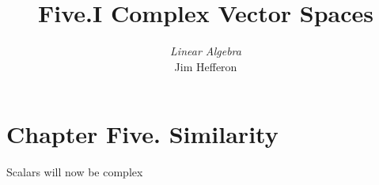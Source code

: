 \usepackage{linalgjh}
\usepackage{present}
\usepackage{directories}  %
\usepackage{xr} %
\usepackage{catchfilebetweentags}
\usepackage{etoolbox} %
\makeatletter
\patchcmd{\CatchFBT@Fin@l}{\endlinechar\m@ne}{}
  {}{}
\makeatother

\usepackage{polynom}  %

{
}
\hypersetup{colorlinks=true,linkcolor=blue} 

\title[Complex Vector Spaces] %
{Five.I Complex Vector Spaces}

\author{\textit{Linear Algebra} \\ {\small Jim Hef{}feron}}
\date{}


\subject{Complex Vector Spaces}


\begin{frame}
  \titlepage
\end{frame}




\section{Chapter Five.  Similarity}
\begin{frame}{Scalars will now be complex}

\end{frame}




